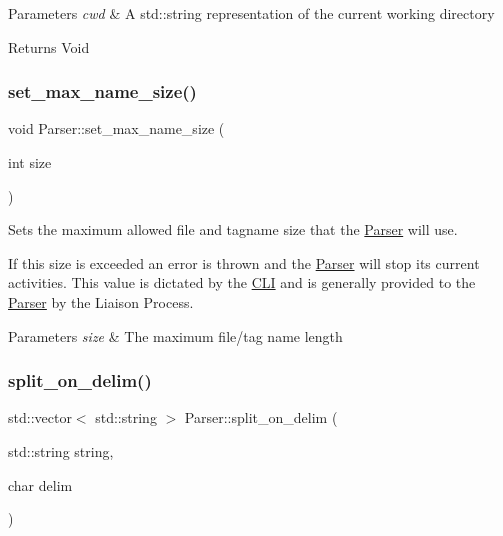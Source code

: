\begin{DoxyParams}{Parameters}
{\em cwd} & A std\+::string representation of the current working directory\\
\hline
\end{DoxyParams}
\begin{DoxyReturn}{Returns}
Void 
\end{DoxyReturn}
\mbox{\label{classParser_ac9c3bf43a7f27f92ecf538b83c5984d6}} 
\subsubsection{\texorpdfstring{set\+\_\+max\+\_\+name\+\_\+size()}{set\_max\_name\_size()}}
{\footnotesize\ttfamily void Parser\+::set\+\_\+max\+\_\+name\+\_\+size (\begin{DoxyParamCaption}\item[{int}]{size }\end{DoxyParamCaption})}



Sets the maximum allowed file and tagname size that the \mbox{\hyperlink{classParser}{Parser}} will use. 

If this size is exceeded an error is thrown and the \mbox{\hyperlink{classParser}{Parser}} will stop its current activities. This value is dictated by the \mbox{\hyperlink{classCLI}{C\+LI}} and is generally provided to the \mbox{\hyperlink{classParser}{Parser}} by the Liaison Process.


\begin{DoxyParams}{Parameters}
{\em size} & The maximum file/tag name length \\
\hline
\end{DoxyParams}
\mbox{\label{classParser_a71c87961db9707dc18db00a645d3d1e5}} 
\subsubsection{\texorpdfstring{split\+\_\+on\+\_\+delim()}{split\_on\_delim()}}
{\footnotesize\ttfamily std\+::vector$<$ std\+::string $>$ Parser\+::split\+\_\+on\+\_\+delim (\begin{DoxyParamCaption}\item[{std\+::string}]{string,  }\item[{char}]{delim }\end{DoxyParamCaption})\hspace{0.3cm}{\ttfamily [static]}}



